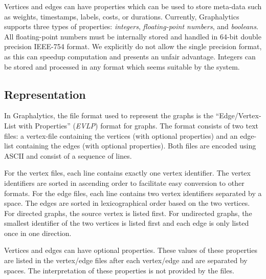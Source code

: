 Vertices and edges can have properties which can be used to store meta-data such as weights, timestamps, labels, costs, or durations. Currently, Graphalytics supports three types of properties: \emph{integers}, \emph{floating-point numbers}, and \emph{booleans}. All floating-point numbers must be internally stored and handled in 64-bit double precision IEEE-754 format. We explicitly do not allow the single precision format, as this can speedup computation and presents an unfair advantage. Integers can be stored and processed in any format which seems suitable by the system.


\subsection{Representation}\label{sec:data:representation}
In Graphalytics, the file format used to represent the graphs is the ``Edge/Vertex-List with Properties'' (\emph{EVLP}) format for graphs. The format consists of two text files: a vertex-file containing the vertices (with optional properties) and an edge-list containing the edges (with optional properties). Both files are encoded using ASCII and consist of a sequence of lines.

For the vertex files, each line contains exactly one vertex identifier. The vertex identifiers are sorted in ascending order to facilitate easy conversion to other formats. For the edge files, each line contains two vertex identifiers separated by a space. The edges are sorted in lexicographical order based on the two vertices. For directed graphs, the source vertex is listed first. For undirected graphs, the smallest identifier of the two vertices is listed first and each edge is only listed once in one direction.

Vertices and edges can have optional properties. These values of these properties are listed in the vertex/edge files after each vertex/edge and are separated by spaces. The interpretation of these properties is not provided by the files.

